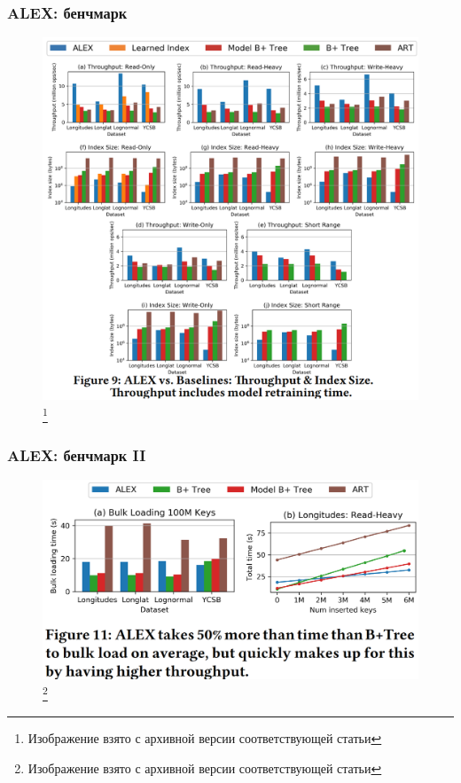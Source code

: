 \documentclass{beamer}
\begin{document}
\begin{frame}
	\frametitle{ALEX: бенчмарк}
	\begin{figure}[htb]
	\includegraphics[width=\textwidth,height=0.8\textheight,keepaspectratio]{alex-bench-1.png} 
	\footnote{\tiny{Изображение взято с архивной версии соответствующей статьи}}
	\end{figure}	
\end{frame}

\begin{frame}
	\frametitle{ALEX: бенчмарк II}
	\begin{figure}[htb]
	\includegraphics[width=\textwidth,height=0.8\textheight,keepaspectratio]{alex-bench-2.png} 
	\footnote{\tiny{Изображение взято с архивной версии соответствующей статьи}}
\end{figure}	
	
\end{frame}
\end{document}
